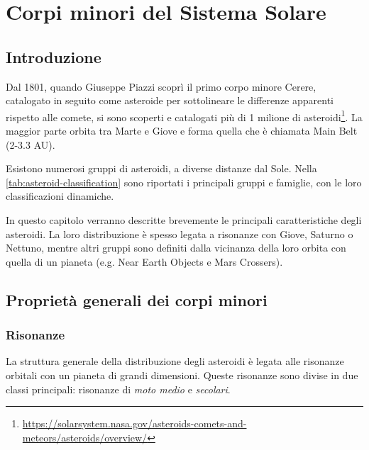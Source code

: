 \documentclass[a4paper,11pt,openright]{book}
\begin{document}
\tableofcontents

\listoftables

\listoffigures


\mainmatter

\chapter{Corpi minori del Sistema Solare}\label{ch:ch_1}

\section{Introduzione}

Dal 1801, quando Giuseppe Piazzi scoprì il primo corpo minore Cerere, catalogato in seguito come asteroide per sottolineare le differenze apparenti rispetto alle comete, si sono scoperti e catalogati più di 1 milione di asteroidi\footnote{\href{https://solarsystem.nasa.gov/asteroids-comets-and-meteors/asteroids/overview/}{https://solarsystem.nasa.gov/asteroids-comets-and-meteors/asteroids/overview/}}. La maggior parte orbita tra Marte e Giove e forma quella che è chiamata Main Belt (2-3.3 AU).

Esistono numerosi gruppi di asteroidi, a diverse distanze dal Sole. Nella \cref{tab:asteroid-classification} sono riportati i principali gruppi e famiglie, con le loro classificazioni dinamiche.

In questo capitolo verranno descritte brevemente le principali caratteristiche degli asteroidi. La loro distribuzione è spesso legata a risonanze con Giove, Saturno o Nettuno, mentre altri gruppi sono definiti dalla vicinanza della loro orbita con quella di un pianeta (e.g. Near Earth Objects e Mars Crossers).

\section{Proprietà generali dei corpi minori}


\subsection{Risonanze}
La struttura generale della distribuzione degli asteroidi è legata alle risonanze orbitali con un pianeta di grandi dimensioni. Queste risonanze sono divise in due classi principali: risonanze di \textit{moto medio} e \textit{secolari}.
\end{document}
